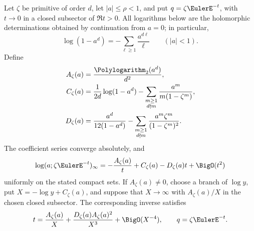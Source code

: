 \begin{theorem}
\label{thm:ip-radial-cyclotomic}
Let \(\zeta\) be primitive of order \(d\), let \(|a|\leq\rho<1\), and put
\(q=\zeta\EulerE^{-t}\), with \(t\to0\) in a closed subsector of \(\Re t>0\).
All logarithms below are the holomorphic determinations obtained by
continuation from \(a=0\); in particular,
\[
 \log(1-a^d)=-\sum_{\ell\geq1}\frac{a^{d\ell}}{\ell}
 \qquad (|a|<1).
\]
Define
\begin{align}
 A_\zeta(a)&=\frac{\Polylogarithm_2(a^d)}{d^2},
 \label{eq:ip-cyclotomic-A}\\
 C_\zeta(a)&=\frac1{2d}\log(1-a^d)
 -\sum_{\substack{m\geq1\\d\nmid m}}
 \frac{a^m}{m(1-\zeta^m)},
 \label{eq:ip-cyclotomic-C}\\
 D_\zeta(a)&=\frac{a^d}{12(1-a^d)}
 -\sum_{\substack{m\geq1\\d\nmid m}}
 \frac{a^m\zeta^m}{(1-\zeta^m)^2}.
 \label{eq:ip-cyclotomic-D}
\end{align}
The coefficient series converge absolutely, and
\begin{equation}
 \log(a;\zeta\EulerE^{-t})_\infty
 =-\frac{A_\zeta(a)}t+C_\zeta(a)-D_\zeta(a)t
 +\BigO(t^2)
 \label{eq:ip-cyclotomic-forward}
\end{equation}
uniformly on the stated compact sets.  If \(A_\zeta(a)\ne0\), choose a branch
of \(\log y\), put \(X=-\log y+C_\zeta(a)\), and suppose that \(X\to\infty\)
with \(A_\zeta(a)/X\) in the chosen closed subsector.  The corresponding
inverse satisfies
\begin{equation}
 t=\frac{A_\zeta(a)}X+
 \frac{D_\zeta(a)A_\zeta(a)^2}{X^3}
 +\BigO(X^{-4}),\qquad q=\zeta\EulerE^{-t}.
 \label{eq:ip-cyclotomic-inverse}
\end{equation}
\end{theorem}

